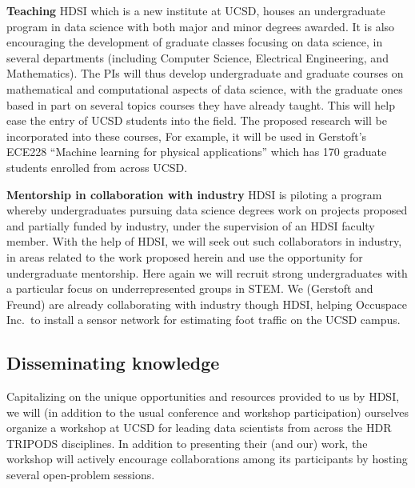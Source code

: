{\bf Teaching}   HDSI which is a new institute at UCSD, houses an undergraduate program in data science with both major and minor degrees awarded.  It is also encouraging the development of graduate classes focusing on data science, in several departments (including Computer Science, Electrical Engineering, and Mathematics). The PIs will thus develop undergraduate and graduate courses on mathematical and computational aspects of data science, with the graduate ones based in part on several topics courses
they have already taught. This will help ease the entry of UCSD  students into the field. The proposed research will be incorporated into these courses, For example, it will be used in Gerstoft's ECE228 ``Machine learning for physical applications'' which has 170 graduate students enrolled from across UCSD.

{\bf Mentorship in collaboration with industry} HDSI is piloting a program whereby undergraduates pursuing data science degrees work on projects proposed and partially funded by industry, under the supervision of an HDSI faculty member. With the help of HDSI, we will seek out such collaborators in industry, in areas related to the work proposed herein and use the opportunity for undergraduate mentorship. Here again we will recruit strong undergraduates with a particular focus on underrepresented groups in STEM. We (Gerstoft and Freund) are already collaborating with industry though HDSI, helping Occuspace Inc.\ to install a sensor network for estimating foot traffic on the UCSD campus.

\subsection*{Disseminating knowledge}
Capitalizing on the unique opportunities and resources provided to us by HDSI, we will (in addition to the usual conference and workshop participation) ourselves organize a workshop at UCSD for leading data scientists from across the HDR TRIPODS disciplines. In addition to presenting their (and our) work, the workshop will actively encourage collaborations among its participants by hosting several open-problem sessions.